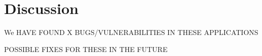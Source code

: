 \chapter{Discussion}
\label{sec:discussion}

We HAVE FOUND X BUGS/VULNERABILITIES IN THESE APPLICATIONS 

POSSIBLE FIXES FOR THESE IN THE FUTURE
